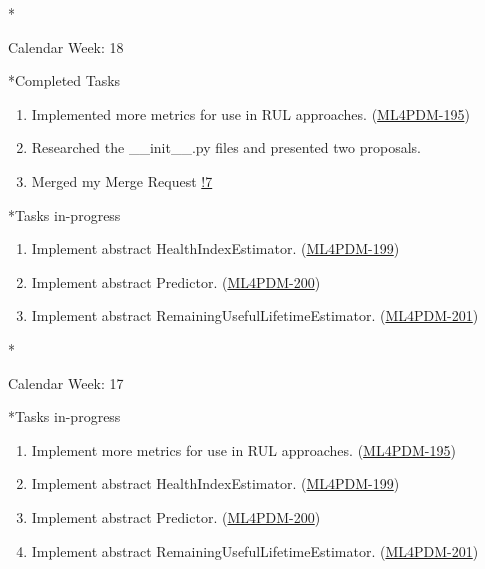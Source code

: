 \documentclass[11pt,a4paper]{article}
\begin{document}
\newpage
\begin{section}*{Calendar Week: 18 \hfill \date{07 May, 2021}}
 \begin{refsection}
   \begin{subsection}*{Completed Tasks}
     \begin{enumerate}
       \item
             Implemented more metrics for use in RUL approaches. (\href{https://ml4pdm.atlassian.net/browse/ML4PDM-195}{ML4PDM-195})
       \item
             Researched the \_\_init\_\_.py files and presented two proposals.
       \item
             Merged my Merge Request \href{https://git.cs.uni-paderborn.de/machine-learning-for-predictive-maintenance/code/-/merge_requests/7}{!7}
     \end{enumerate}
   \end{subsection}
   \begin{subsection}*{Tasks in-progress}
     \begin{enumerate}
       \item
             Implement abstract HealthIndexEstimator. (\href{https://ml4pdm.atlassian.net/browse/ML4PDM-199}{ML4PDM-199})
       \item
             Implement abstract Predictor. (\href{https://ml4pdm.atlassian.net/browse/ML4PDM-200}{ML4PDM-200})
       \item
             Implement abstract RemainingUsefulLifetimeEstimator. (\href{https://ml4pdm.atlassian.net/browse/ML4PDM-201}{ML4PDM-201})
     \end{enumerate}
   \end{subsection}
 \end{refsection}
\end{section}

\newpage
\begin{section}*{Calendar Week: 17 \hfill \date{30 April, 2021}}
 \begin{refsection}
   \begin{subsection}*{Tasks in-progress}
     \begin{enumerate}
       \item
             Implement more metrics for use in RUL approaches. (\href{https://ml4pdm.atlassian.net/browse/ML4PDM-195}{ML4PDM-195})
       \item
             Implement abstract HealthIndexEstimator. (\href{https://ml4pdm.atlassian.net/browse/ML4PDM-199}{ML4PDM-199})
       \item
             Implement abstract Predictor. (\href{https://ml4pdm.atlassian.net/browse/ML4PDM-200}{ML4PDM-200})
       \item
             Implement abstract RemainingUsefulLifetimeEstimator. (\href{https://ml4pdm.atlassian.net/browse/ML4PDM-201}{ML4PDM-201})
     \end{enumerate}
   \end{subsection}
 \end{refsection}
\end{section}
\end{document}
